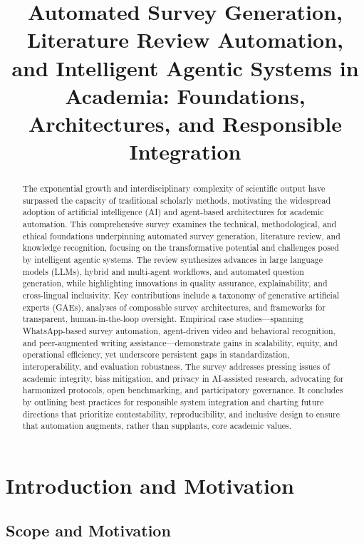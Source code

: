 \title{Automated Survey Generation, Literature Review Automation, and Intelligent Agentic Systems in Academia: Foundations, Architectures, and Responsible Integration}
\maketitle

\begin{abstract}
The exponential growth and interdisciplinary complexity of scientific output have surpassed the capacity of traditional scholarly methods, motivating the widespread adoption of artificial intelligence (AI) and agent-based architectures for academic automation. This comprehensive survey examines the technical, methodological, and ethical foundations underpinning automated survey generation, literature review, and knowledge recognition, focusing on the transformative potential and challenges posed by intelligent agentic systems. The review synthesizes advances in large language models (LLMs), hybrid and multi-agent workflows, and automated question generation, while highlighting innovations in quality assurance, explainability, and cross-lingual inclusivity. Key contributions include a taxonomy of generative artificial experts (GAEs), analyses of composable survey architectures, and frameworks for transparent, human-in-the-loop oversight. Empirical case studies—spanning WhatsApp-based survey automation, agent-driven video and behavioral recognition, and peer-augmented writing assistance—demonstrate gains in scalability, equity, and operational efficiency, yet underscore persistent gaps in standardization, interoperability, and evaluation robustness. The survey addresses pressing issues of academic integrity, bias mitigation, and privacy in AI-assisted research, advocating for harmonized protocols, open benchmarking, and participatory governance. It concludes by outlining best practices for responsible system integration and charting future directions that prioritize contestability, reproducibility, and inclusive design to ensure that automation augments, rather than supplants, core academic values.
\end{abstract}

\section{Introduction and Motivation}

\subsection{Scope and Motivation}

